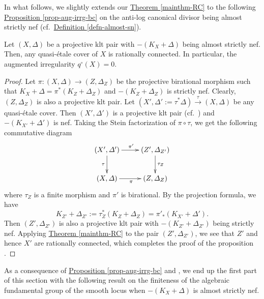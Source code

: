 In what follows, we slightly extends our  \hyperref[mainthm-RC]{Theorem \ref*{mainthm-RC}}   
to the following \hyperref[prop-aug-irrg-bc]{Proposition \ref*{prop-aug-irrg-bc}}  on the anti-log canonical divisor being almost strictly nef (cf.~\hyperref[defn-almost-sn]{Definition \ref*{defn-almost-sn}}).   




\begin{prop}\label{prop-aug-irrg-bc}
Let $(X,\Delta)$ be a projective klt pair with $-(K_X+\Delta)$ being almost strictly nef.
Then, any quasi-\'etale cover of $X$ is rationally connected.
In particular, the augmented irregularity $q^\circ(X)=0$.
\end{prop}


\begin{proof} 
Let $\pi:(X,\Delta)\to (Z,\Delta_Z)$ be the projective birational morphism such that $K_X+\Delta=\pi^*(K_Z+\Delta_Z)$ and $-(K_Z+\Delta_Z)$ is strictly nef.
Clearly, $(Z,\Delta_Z)$ is also a projective klt pair.
Let $(X',\Delta':=\tau^*\Delta)\xrightarrow{\tau}(X,\Delta)$  be any quasi-\'etale cover. 
Then $(X',\Delta')$ is a projective klt pair (cf.~\cite[Proposition 5.20]{KM98}) and $-(K_{X'}+\Delta')$ is nef.
Taking the Stein factorization of $\pi\circ\tau$, we get the following commutative diagram
\[\xymatrix{
(X',\Delta')\ar[r]^{\pi'}\ar[d]_\tau&(Z',\Delta_{Z'})\ar[d]^{\tau_Z}\\
(X,\Delta)\ar[r]_\pi&(Z,\Delta_Z)
}
\]
where $\tau_Z$ is a finite morphism and $\pi'$ is birational.
By the projection formula, we have $$K_{Z'}+\Delta_{Z'}:=\tau_Z^*(K_Z+\Delta_Z)=\pi'_*(K_{X'}+\Delta').$$
Then $(Z',\Delta_{Z'})$ is also a projective klt pair with $-(K_{Z'}+\Delta_{Z'})$ being strictly nef.
Applying \hyperref[mainthm-RC]{Theorem \ref*{mainthm-RC}} to the pair $(Z',\Delta_{Z'})$, we see that $Z'$ and hence $X'$ are rationally connected, which completes the proof of the proposition . 
\end{proof}

As a  consequence of
{\hyperref[prop-aug-irrg-bc]{Proposition \ref*{prop-aug-irrg-bc}}}
 and \cite[Proposition 7.8]{GKP16b}, we end up the first part of this section with  the following result on the finiteness of the algebraic fundamental group of the smooth locus when  $-(K_X+\Delta)$ is almost strictly nef.

